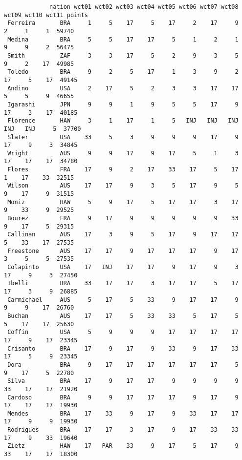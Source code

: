 \documentclass[12pt]{article}
\begin{document}
{\footnotesize
\begin{verbatim}
             nation wct01 wct02 wct03 wct04 wct05 wct06 wct07 wct08 wct09 wct10 wct11 points
 Ferreira       BRA     1     5    17     5    17     2    17     9     2     1     1  59740
 Medina         BRA     5     5    17    17     5     1     2     1     9     9     2  56475
 Smith          ZAF     3     3    17     5     2     9     3     5     9     2    17  49985
 Toledo         BRA     9     2     5    17     1     3     9     2    17     5    17  49145
 Andino         USA     2    17     5     2     3     3    17    17     5     5     9  46655
 Igarashi       JPN     9     9     1     9     5     5    17     9    17     3    17  40185
 Florence       HAW     3     1    17     1     5   INJ   INJ   INJ   INJ   INJ     5  37700
 Slater         USA    33     5     3     9     9     9    17     9    17     9     3  34845
 Wright         AUS     9     9    17     9    17     5     1     3    17    17    17  34780
 Flores         FRA    17     9     2    17    33    17     5    17     1    17    33  32515
 Wilson         AUS    17    17     9     3     5    17     9     5     9    17     9  31515
 Moniz          HAW     5     9    17     5    17    17     3    17     9    33     9  29525
 Bourez         FRA     9    17     9     9     9     9     9    33     9    17     5  29315
 Callinan       AUS    17     3     9     5    17     9    17    17     5    33    17  27535
 Freestone      AUS    17    17     9    17    17    17     9    17     3     5     5  27535
 Colapinto      USA    17   INJ    17    17     9    17     9     3    17     9     3  27450
 Ibelli         BRA    33    17    17     3    17    17     5    17    17     3     9  26885
 Carmichael     AUS     5    17     5    33     9    17    17     9     9     9    17  26760
 Buchan         AUS    17    17     5    33    33     5    17     5     5    17    17  25630
 Coffin         USA     5     9     9     9    17    17    17    17    17     9    17  23345
 Crisanto       BRA    17     9    17     9    33     9    17    33    17     5     9  23345
 Dora           BRA     9    17    17    17    17    17    17     5     9    17     5  22780
 Silva          BRA    17     9    17    17     9     9     9     9    33    17    17  21920
 Cardoso        BRA     9     9    17    17    17     9    17     9    17    17    17  19930
 Mendes         BRA    17    33     9    17     9    33    17    17    17     9     9  19930
 Rodrigues      BRA    17    17     3    17     9    17    33    33    17     9    33  19640
 Zietz          HAW    17   PAR    33     9    17     5    17     9    33    17    17  18300

\end{verbatim}}
\end{document}
